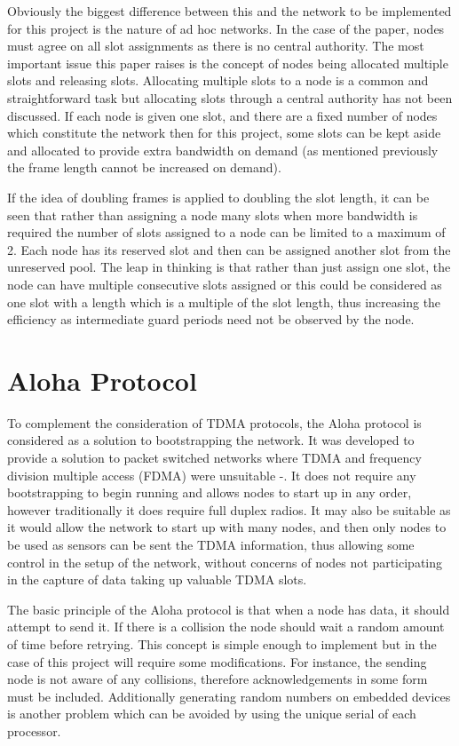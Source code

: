 \documentclass[parskip]{cs4rep}
\begin{document}
Obviously the biggest difference between this and the network to be implemented for this project is the nature of ad hoc networks. In the case of the paper, nodes must agree on all slot assignments as there is no central authority. The most important issue this paper raises is the concept of nodes being allocated multiple slots and releasing slots. Allocating multiple slots to a node is a common and straightforward task but allocating slots through a central authority has not been discussed. If each node is given one slot, and there are a fixed number of nodes which constitute the network then for this project, some slots can be kept aside and allocated to provide extra bandwidth on demand (as mentioned previously the frame length cannot be increased on demand).

If the idea of doubling frames is applied to doubling the slot length, it can be seen that rather than assigning a node many slots when more bandwidth is required the number of slots assigned to a node can be limited to a maximum of 2. Each node has its reserved slot and then can be assigned another slot from the unreserved pool. The leap in thinking is that rather than just assign one slot, the node can have multiple consecutive slots assigned or this could be considered as one slot with a length which is a multiple of the slot length, thus increasing the efficiency as intermediate guard periods need not be observed by the node.

\section{Aloha Protocol}

To complement the consideration of TDMA protocols, the Aloha protocol is considered as a solution to bootstrapping the network. It was developed to provide a solution to packet switched networks where TDMA and frequency division multiple access (FDMA) were unsuitable \cite{PR4}-\cite{PR5}. It does not require any bootstrapping to begin running and allows nodes to start up in any order, however traditionally it does require full duplex radios. It may also be suitable as it would allow the network to start up with many nodes, and then only nodes to be used as sensors can be sent the TDMA information, thus allowing some control in the setup of the network, without concerns of nodes not participating in the capture of data taking up valuable TDMA slots.

The basic principle of the Aloha protocol is that when a node has data, it should attempt to send it. If there is a collision the node should wait a random amount of time before retrying. This concept is simple enough to implement but in the case of this project will require some modifications. For instance, the sending node is not aware of any collisions, therefore acknowledgements in some form must be included. Additionally generating random numbers on embedded devices is another problem which can be avoided by using the unique serial of each processor.
\end{document}

